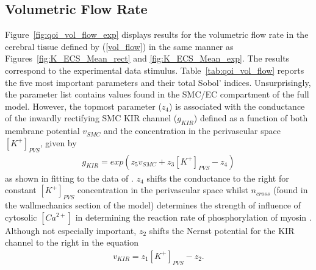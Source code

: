 \subsection{Volumetric Flow Rate}
Figure~\ref{fig:qoi_vol_flow_exp} displays results for the volumetric flow rate in the cerebral tissue defined by (\ref{vol_flow})  in the same manner as Figures~\ref{fig:K_ECS_Mean_rect} and \ref{fig:K_ECS_Mean_exp}. The results correspond to the experimental data stimulus.  Table~\ref{tab:qoi_vol_flow} reports the five most important parameters and their total Sobol' indices. Unsurprisingly, the parameter list contains values found in the SMC/EC compartment of the full model. However, the topmost parameter ($z_4$) is associated with the conductance of the inwardly rectifying SMC KIR channel ($g_{KIR}$) defined as a function of both membrane potential $v_{SMC}$ and the \pot concentration in the perivascular space $[K^+]_{PVS}$, given by 
\begin{eqnarray}
g_{KIR}=exp\left( z_5 v_{SMC}+z_3[K^+]_{PVS}-z_4\right)  \label{eqn:gkir}
\end{eqnarray}
as shown in \cite{Dormanns2015} fitting to the data of \cite{Filosa2006}. $z_4$ shifts the conductance to the right for constant $[K^+]_{PVS}$  concentration in the perivascular space whilst $n_{cross}$ (found in the wallmechanics section of the model) determines the strength of influence of cytosolic $[Ca^{2+}]$ in determining the reaction rate of phosphorylation of myosin \cite{Hai1988}. Although not especially important, $z_2$ shifts the Nernst potential for the KIR channel to the right in the equation
\begin{eqnarray}
v_{KIR}=z_1 [K^+]_{PVS}-z_2. \label{vkir}
\end{eqnarray}

